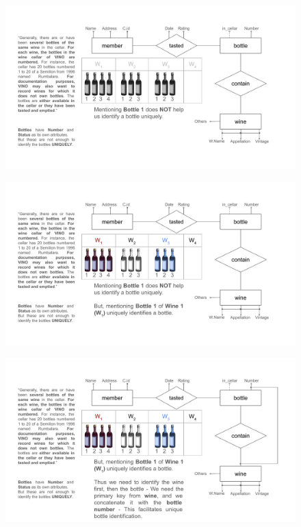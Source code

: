 \documentclass{beamer}
\begin{document}
\begin{frame}
    \begin{figure}
        \centering
        \includegraphics[width=1.1\linewidth]{tut_02_files/06.pdf}
    \end{figure}
\end{frame}

\begin{frame}
    \begin{figure}
        \centering
        \includegraphics[width=1.1\linewidth]{tut_02_files/07.pdf}
    \end{figure}
\end{frame}

\begin{frame}
    \begin{figure}
        \centering
        \includegraphics[width=1.1\linewidth]{tut_02_files/08.pdf}
    \end{figure}
\end{frame}
\end{document}
